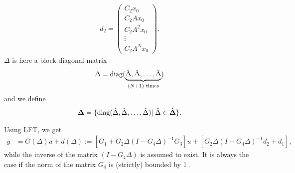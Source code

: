 \begin{align}
d_2 = \begin{pmatrix}
C_2 x_0 \\ C_2A x_0 \\ C_2A^2 x_0 \\ \vdots \\ C_2A^Nx_0
\end{pmatrix}.
\end{align}
$\Delta$ is here a block diagonal matrix 
\begin{align}
\Delta = \operatorname*{diag}(\underbrace{\hat{\Delta}, \hat{\Delta}, \dots, \hat{\Delta}}_{(N+1) \text{ times}})
\end{align}
and we define 
\begin{align}
\mathbf{\Delta} = \{\operatorname*{diag}(\hat{\Delta}, \hat{\Delta}, \dots, \hat{\Delta})| \; \hat{\Delta}\in \hat{\mathbf{\Delta}}\}.
\end{align}




Using LFT, we get 
\begin{align}
\label{eq:rob:y = G(Delta) + d(Delta)}
y&= G(\Delta)u + d(\Delta) := \left[G_1 + G_2 \Delta (I - G_4\Delta)^{-1}G_3\right] u + \left[G_2 \Delta (I - G_4\Delta)^{-1} d_2 + d_1\right], 
\end{align}
while the inverse of the matrix $(I - G_4\Delta)$ is assumed to exist. It is always the case if the norm of the matrix $G_4$ is (strictly) bounded by 1 \cite{SchRC}.




